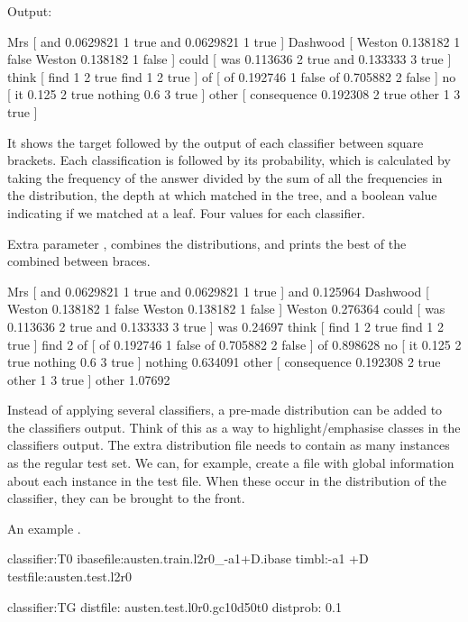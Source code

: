 \documentclass[a4paper,10pt,twoside]{report}
\begin{document}
Output:
\begin{wout}{}
Mrs [ and 0.0629821 1 true and 0.0629821 1 true ]
Dashwood [ Weston 0.138182 1 false Weston 0.138182 1 false ]
could [ was 0.113636 2 true and 0.133333 3 true ]
think [ find 1 2 true find 1 2 true ]
of [ of 0.192746 1 false of 0.705882 2 false ]
no [ it 0.125 2 true nothing 0.6 3 true ]
other [ consequence 0.192308 2 true other 1 3 true ]
\end{wout}

It shows the target followed by the output of each classifier between
square brackets. Each classification is followed by its probability,
which is calculated by taking the frequency of the answer divided by
the sum of all the frequencies in the distribution, the depth at which
\Timbl{} matched in the tree, and a boolean value indicating if we
matched at a leaf. Four values for each classifier.

\par
Extra parameter , combines the distributions, and prints the
best of the combined between braces.

\begin{wout}{}
Mrs [ and 0.0629821 1 true and 0.0629821 1 true ] { and 0.125964 }
Dashwood [ Weston 0.138182 1 false Weston 0.138182 1 false ] { Weston 0.276364 }
could [ was 0.113636 2 true and 0.133333 3 true ] { was 0.24697 }
think [ find 1 2 true find 1 2 true ] { find 2 }
of [ of 0.192746 1 false of 0.705882 2 false ] { of 0.898628 }
no [ it 0.125 2 true nothing 0.6 3 true ] { nothing 0.634091 }
other [ consequence 0.192308 2 true other 1 3 true ] { other 1.07692 }
\end{wout}

Instead of applying several classifiers, a pre-made distribution can
be added to the classifiers output. Think of this as a way to
highlight/emphasise classes in the classifiers output. The extra
distribution file needs to contain as many instances as the regular
test set. We can, for example, create a file with global information
about each instance in the test file. When these occur in the
distribution of the classifier, they can be brought to the front.

An example .

\begin{wout}{}%
classifier:T0
ibasefile:austen.train.l2r0_-a1+D.ibase
timbl:-a1 +D
testfile:austen.test.l2r0

classifier:TG
distfile: austen.test.l0r0.gc10d50t0
distprob: 0.1
\end{wout}
\end{document}
